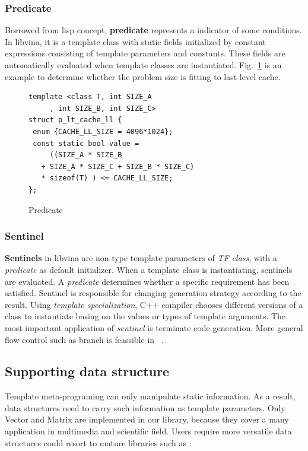 \documentclass[10pt, conference, compsocconf]{IEEEtran}
\begin{document}
\subsubsection{Predicate}
Borrowed from lisp concept, \textbf{predicate} represents a indicator
of some conditions. In libvina, it is a template class with static
fields initialized by constant expressions consisting of template
parameters and constants. These fields are automatically evaluated
when template classes are instantiated. Fig.~\ref{lst:pred} is an example to determine whether the problem size is fitting to last level cache.

\begin{figure}[!htp]
\begin{minipage}[tb]{\linewidth}
\makebox[\textwidth]{\hrulefill}
\begin{small}
\begin{verbatim}
template <class T, int SIZE_A
     , int SIZE_B, int SIZE_C>
struct p_lt_cache_ll {
 enum {CACHE_LL_SIZE = 4096*1024};
 const static bool value = 
     ((SIZE_A * SIZE_B 
   + SIZE_A * SIZE_C + SIZE_B * SIZE_C) 
   * sizeof(T) ) <= CACHE_LL_SIZE;
};
\end{verbatim}
\end{small}
\vspace{-1ex}\makebox[\textwidth]{\hrulefill}
\end{minipage}
\caption{Predicate}\label{lst:pred}
\end{figure}

\subsubsection{Sentinel}
\textbf{Sentinels} in libvina are non-type template parameters of \emph{TF class}, with a \emph{predicate} as default initializer. When a template class is instantiating, sentinels are evaluated.  A \emph{predicate} determines whether a specific requirement has been satisfied. Sentinel is responsible for changing generation strategy according to the result. Using \emph{template specialization}, C++ compiler chooses different versions of a class to instantiate basing on the values or types of template arguments. The most important application of \emph{sentinel} is terminate code generation. More general flow control such as branch is feassible in ~\cite{b16}.

\subsection{Supporting data structure}
Template meta-programing can only manipulate static information. As a
result, data structures need to carry such information as template
parameters. Only Vector and Matrix are implemented in our library,
because they cover a many application in multimedia
and scientific field. Users require more versatile data structures could resort to
mature libraries such as \cite{b10}. 
\end{document}
